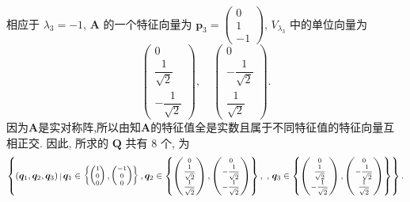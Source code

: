 \documentclass[../../main.tex]{subfiles}
\begin{document}
\begin{solution}
相应于 \( \lambda_3 = -1 \), \( \boldsymbol{A} \) 的一个特征向量为 \( \boldsymbol{p}_3 = \begin{pmatrix} 0 \\ 1 \\ -1 \end{pmatrix} \), \( V_{\lambda_3} \) 中的单位向量为
\[
\begin{pmatrix} 0 \\ \dfrac{1}{\sqrt{2}} \\ -\dfrac{1}{\sqrt{2}} \end{pmatrix}, \quad \begin{pmatrix} 0 \\ -\dfrac{1}{\sqrt{2}} \\ \dfrac{1}{\sqrt{2}} \end{pmatrix}.
\]
因为$\boldsymbol{A}$是实对称阵,所以由知$\boldsymbol{A}$的特征值全是实数且属于不同特征值的特征向量互相正交.
因此, 所求的 \( \boldsymbol{Q} \) 共有 \( 8 \) 个, 为
$$
\begin{scriptsize}
\left\{ (\boldsymbol{q}_1, \boldsymbol{q}_2, \boldsymbol{q}_3) \,\big|\, \boldsymbol{q}_1 \in \left\{ \begin{pmatrix} 1 \\ 0 \\ 0 \end{pmatrix}, \begin{pmatrix} -1 \\ 0 \\ 0 \end{pmatrix} \right\}, \boldsymbol{q}_2 \in \left\{ \begin{pmatrix} 0 \\ \dfrac{1}{\sqrt{2}} \\ \dfrac{1}{\sqrt{2}} \end{pmatrix}, \begin{pmatrix} 0 \\ -\dfrac{1}{\sqrt{2}} \\ -\dfrac{1}{\sqrt{2}} \end{pmatrix} \right\}, \right.,
\left. \boldsymbol{q}_3 \in \left\{ \begin{pmatrix} 0 \\ \dfrac{1}{\sqrt{2}} \\ -\dfrac{1}{\sqrt{2}} \end{pmatrix}, \begin{pmatrix} 0 \\ -\dfrac{1}{\sqrt{2}} \\ \dfrac{1}{\sqrt{2}} \end{pmatrix} \right\} \right\}.
\end{scriptsize}
$$

\end{solution}
\end{document}
